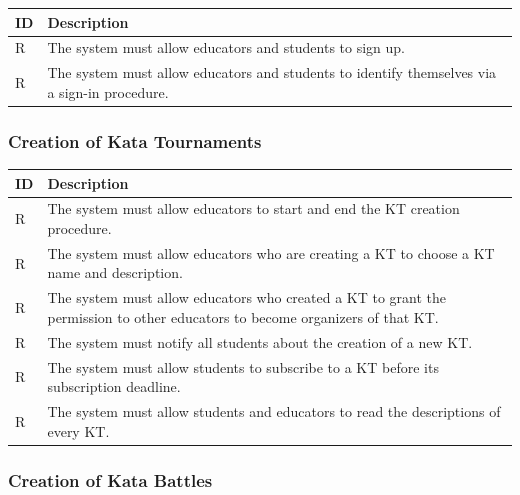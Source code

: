 \documentclass[11pt]{report}
\newcounter{rcounter}
\newcommand{\rc}{
    \addtocounter{rcounter}{1}
    R\arabic{rcounter}
}
\begin{document}
\begin{longtable}[h] {|p{10mm}|p{130mm}|}
\hline
\rowcolor{gray!20}
\textbf{ID} & \textbf{Description} \\ \hline
    \rc & The system must allow educators and students to sign up.
    \\ \hline
    \rc & The system must allow educators and students to identify themselves via a sign-in procedure.
    \\ \hline
\end{longtable}

\subsubsection*{Creation of Kata Tournaments}

\begin{longtable}[h] {|p{10mm}|p{130mm}|}
\hline
\rowcolor{gray!20}
\textbf{ID} & \textbf{Description} \\ \hline
    \rc & The system must allow educators to start and end the KT creation procedure\@.
    \\ \hline
    \rc & The system must allow educators who are creating a KT to choose a KT name and description.
    \\ \hline
    \rc & The system must allow educators who created a KT to grant the permission to other educators to become organizers of that KT\@.
    \\ \hline
    \rc & The system must notify all students about the creation of a new KT\@.
    \\ \hline
    \rc & The system must allow students to subscribe to a KT before its subscription deadline.
    \\ \hline
    \rc & The system must allow students and educators to read the descriptions of every KT\@.
    \\ \hline
\end{longtable}

\subsubsection*{Creation of Kata Battles}
\end{document}
